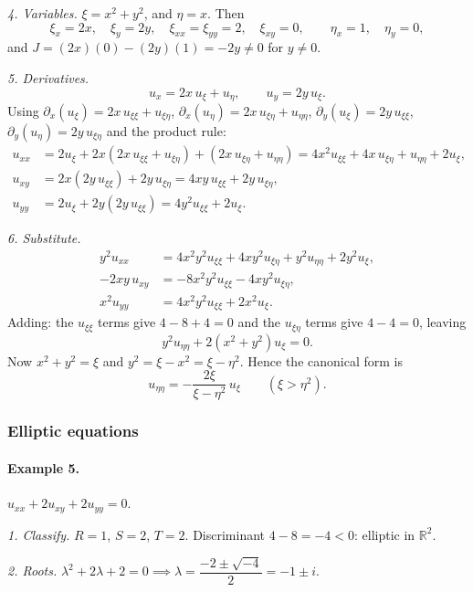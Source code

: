\documentclass[11pt]{article}
\theoremstyle{plain}
\theoremstyle{definition}
\theoremstyle{remark}
\begin{document}
\emph{4. Variables.} $\xi = x^2 + y^2$, and $\eta = x$. Then
$$ \xi_x = 2x, \quad \xi_y = 2y, \quad \xi_{xx} = \xi_{yy} = 2, \quad \xi_{xy} = 0, \qquad \eta_x = 1, \quad \eta_y = 0, $$
and $J = (2x)(0) - (2y)(1) = -2y \neq 0$ for $y \neq 0$.

\emph{5. Derivatives.}
$$ u_x = 2x\,u_\xi + u_\eta, \qquad u_y = 2y\,u_\xi. $$
Using $\partial_x(u_\xi) = 2x\,u_{\xi\xi} + u_{\xi\eta}$, $\partial_x(u_\eta) = 2x\,u_{\xi\eta} + u_{\eta\eta}$, $\partial_y(u_\xi) = 2y\,u_{\xi\xi}$, $\partial_y(u_\eta) = 2y\,u_{\xi\eta}$ and the product rule:
\begin{align*}
u_{xx} &= 2u_\xi + 2x(2x\,u_{\xi\xi} + u_{\xi\eta}) + (2x\,u_{\xi\eta} + u_{\eta\eta}) = 4x^2u_{\xi\xi} + 4x\,u_{\xi\eta} + u_{\eta\eta} + 2u_\xi, \\
u_{xy} &= 2x(2y\,u_{\xi\xi}) + 2y\,u_{\xi\eta} = 4xy\,u_{\xi\xi} + 2y\,u_{\xi\eta}, \\
u_{yy} &= 2u_\xi + 2y(2y\,u_{\xi\xi}) = 4y^2u_{\xi\xi} + 2u_\xi.
\end{align*}

\emph{6. Substitute.}
\begin{align*}
y^2u_{xx} &= 4x^2y^2u_{\xi\xi} + 4xy^2u_{\xi\eta} + y^2u_{\eta\eta} + 2y^2u_\xi, \\
-2xy\,u_{xy} &= -8x^2y^2u_{\xi\xi} - 4xy^2u_{\xi\eta}, \\
x^2u_{yy} &= 4x^2y^2u_{\xi\xi} + 2x^2u_\xi.
\end{align*}
Adding: the $u_{\xi\xi}$ terms give $4 - 8 + 4 = 0$ and the $u_{\xi\eta}$ terms give $4 - 4 = 0$, leaving
$$ y^2u_{\eta\eta} + 2(x^2 + y^2)u_\xi = 0. $$
Now $x^2 + y^2 = \xi$ and $y^2 = \xi - x^2 = \xi - \eta^2$. Hence the canonical form is
$$ u_{\eta\eta} = -\frac{2\xi}{\xi - \eta^2}\,u_\xi \qquad (\xi > \eta^2). $$

\subsubsection{Elliptic equations}

\paragraph{Example 5.} $u_{xx} + 2u_{xy} + 2u_{yy} = 0$.

\emph{1. Classify.} $R = 1$, $S = 2$, $T = 2$. Discriminant $4 - 8 = -4 < 0$: elliptic in $\mathbb{R}^2$.

\emph{2. Roots.} $\lambda^2 + 2\lambda + 2 = 0 \implies \lambda = \dfrac{-2 \pm \sqrt{-4}}{2} = -1 \pm i$.
\end{document}
